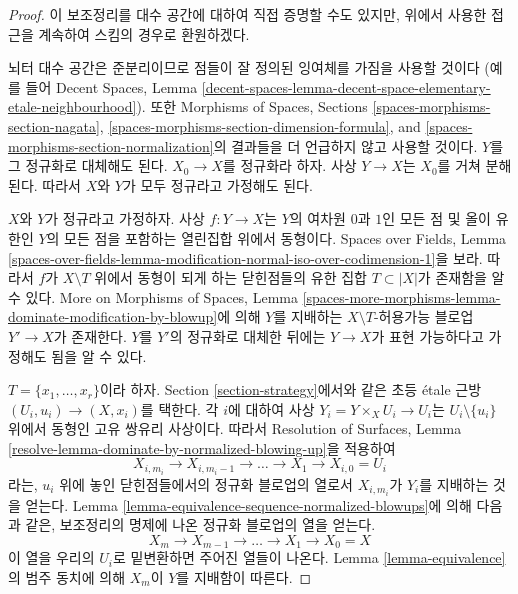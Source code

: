 \begin{proof}
이 보조정리를 대수 공간에 대하여 직접 증명할 수도 있지만,
위에서 사용한 접근을 계속하여 스킴의 경우로 환원하겠다.

\medskip\noindent
뇌터 대수 공간은 준분리이므로 점들이 잘 정의된 잉여체를 가짐을 사용할 것이다
(예를 들어 Decent Spaces, Lemma
\ref{decent-spaces-lemma-decent-space-elementary-etale-neighbourhood}).
또한 Morphisms of Spaces, Sections
\ref{spaces-morphisms-section-nagata},
\ref{spaces-morphisms-section-dimension-formula}, and
\ref{spaces-morphisms-section-normalization}의 결과들을
더 언급하지 않고 사용할 것이다.
$Y$를 그 정규화로 대체해도 된다. $X_0 \to X$를 정규화라 하자.
사상 $Y \to X$는 $X_0$를 거쳐 분해된다.
따라서 $X$와 $Y$가 모두 정규라고 가정해도 된다.

\medskip\noindent
$X$와 $Y$가 정규라고 가정하자. 사상 $f : Y \to X$는
$Y$의 여차원 $0$과 $1$인 모든 점 및 올이 유한인 $Y$의 모든 점을
포함하는 열린집합 위에서 동형이다. Spaces over Fields, Lemma
\ref{spaces-over-fields-lemma-modification-normal-iso-over-codimension-1}을 보라.
따라서 $f$가 $X \setminus T$ 위에서 동형이 되게 하는
닫힌점들의 유한 집합 $T \subset |X|$가 존재함을 알 수 있다.
More on Morphisms of Spaces, Lemma
\ref{spaces-more-morphisms-lemma-dominate-modification-by-blowup}에 의해
$Y$를 지배하는 $X \setminus T$-허용가능 블로업 $Y' \to X$가 존재한다.
$Y$를 $Y'$의 정규화로 대체한 뒤에는
$Y \to X$가 표현 가능하다고 가정해도 됨을 알 수 있다.

\medskip\noindent
$T = \{x_1, \ldots, x_r\}$이라 하자. Section \ref{section-strategy}에서와 같은
초등 \'etale 근방 $(U_i, u_i) \to (X, x_i)$를 택한다.
각 $i$에 대하여 사상 $Y_i = Y \times_X U_i \to U_i$는
$U_i \setminus \{u_i\}$ 위에서 동형인 고유 쌍유리 사상이다.
따라서 Resolution of Surfaces, Lemma
\ref{resolve-lemma-dominate-by-normalized-blowing-up}을 적용하여
$$
X_{i, m_i} \to X_{i, m_i - 1} \to \ldots \to X_1 \to X_{i, 0} = U_i
$$
라는, $u_i$ 위에 놓인 닫힌점들에서의 정규화 블로업의 열로서
$X_{i, m_i}$가 $Y_i$를 지배하는 것을 얻는다.
Lemma \ref{lemma-equivalence-sequence-normalized-blowups}에 의해
다음과 같은, 보조정리의 명제에 나온 정규화 블로업의 열을 얻는다.
$$
X_m \to X_{m - 1} \to \ldots \to X_1 \to X_0 = X
$$
이 열을 우리의 $U_i$로 밑변환하면 주어진 열들이 나온다.
Lemma \ref{lemma-equivalence}의 범주 동치에 의해
$X_m$이 $Y$를 지배함이 따른다.
\end{proof}





